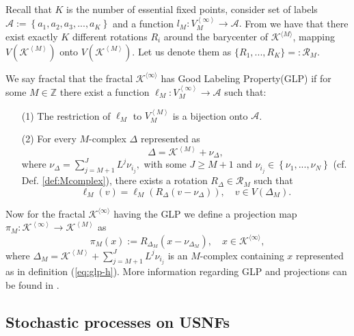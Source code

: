 \documentclass[11pt]{article}
\begin{document}
Recall that $K$ is the number of essential fixed points,  consider set of labels $\mathcal{A}:=\left\{a_1, a_2,a_3,...,a_K\right\}$ and a function  $l_M: V^{\left\langle \infty \right\rangle}_{M} \to \mathcal{A}.$ From \cite[Proposition 2.1]{bib:KaPP2} we have that there exist exactly $K$ different rotations $R_i$  around the barycenter of $\mathcal K^{\langle M \rangle}$,  mapping $V(\mathcal{K}^{\left\langle M \right\rangle})$ onto $V(\mathcal{K}^{\left\langle M \right\rangle}).$ Let us denote them as $\{R_1, ..., R_K\}=: \mathcal{R}_M.$\\
\begin{defi}\label{def:glp}
We say fractal that the fractal  $\mathcal K^{\langle \infty\rangle}$ has Good Labeling Property(GLP) if for some $M \in \mathbb{Z}$ there exist a function  $\ell_M: V^{\left\langle \infty \right\rangle}_{M} \to \mathcal{A}$ such that:
\begin{itemize}
\item[(1)] The restriction of $\ell_M$ to $V^{\left\langle M \right\rangle}_{M}$ is a bijection onto $\mathcal{A}$.
\item[(2)] For every $M$-complex $\Delta$ represented as
$$
\Delta  = \mathcal{K}^{\left\langle M \right\rangle} +\nu_{\Delta},
$$
where $\nu_{\Delta}=  \sum_{j=M+1}^{J} L^{j} \nu_{i_j},$  with some $J \geq M+1$ and $\nu_{i_j} \in \left\{\nu_1,...,\nu_N\right\}$ (cf. Def. \ref{def:Mcomplex}), there exists a rotation $R_{\Delta} \in \mathcal{R}_M$ such that
\begin{equation}\label{eq:glp-h}
\ell_M(v)=\ell_M\left(R_{\Delta}\left(v -\nu_{\Delta}\right)\right) , \quad v \in V\left(\Delta_M\right).
\end{equation}
\end{itemize}
\end{defi}
Now for the fractal $\mathcal K^{\langle \infty\rangle}$ having the GLP we define a projection map $\pi_{M}: \mathcal{K}^{\left\langle \infty \right\rangle} \rightarrow \mathcal{K}^{\left\langle M \right\rangle}$ as
$$
\pi_M(x) := R_{\Delta_M}\left(x -\nu_{\Delta_M}\right),\quad x\in \mathcal K^{\langle \infty\rangle},
$$
where $\Delta_M = \mathcal{K}^{\left\langle M \right\rangle} +  \sum_{j=M+1}^{J} L^{j} \nu_{i_j}$ is an $M$-complex containing $x$ represented as in definition (\ref{eq:glp-h}). More information regarding GLP and projections can be found in \cite{bib:KOP}.

\subsection{Stochastic processes on USNFs}
\end{document}

